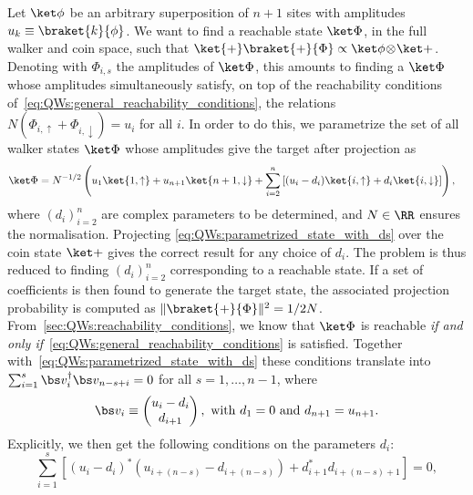 Let $\ket\phi$ be an arbitrary superposition of $n+1$ sites with amplitudes $u_k \equiv \braket{k}{\phi}$.
We want to find a reachable state $\ket\Phi$, in the full walker and coin space, such that
$\ket{+}\braket{+}{\Phi} \propto \ket\phi \!\otimes\! \ket+$.
Denoting with $\Phi_{i,s}$ the amplitudes of $\ket\Phi$, this amounts to finding a $\ket\Phi$ whose amplitudes simultaneously satisfy, on top of the reachability conditions of~\cref{eq:QWs:general_reachability_conditions}, the relations
${N(\Phi_{i,\uparrow}+\Phi_{i,\downarrow})= u_i}$ for all $i$.
In order to do this, we parametrize the set of all walker states $\ket\Phi$ whose amplitudes give the target after projection as
\begin{equation}
\begin{aligned}
    \ket\Phi &= N^{-1/2} \left( u_1 \ket{1,\uparrow} + u_{n+1} \ket{n+1,\downarrow}
	+ \sum_{i=2}^n \left[
		(u_i - d_i) \ket{i, \uparrow} +
		d_i \ket{i, \downarrow}
	\right] \right),
\end{aligned}
\label{eq:QWs:parametrized_state_with_ds}
\end{equation}
where $(d_i)_{i=2}^n$ are complex parameters to be determined, and $N\in\RR$ ensures the normalisation.
Projecting \cref{eq:QWs:parametrized_state_with_ds} over the coin state $\ket+$ gives the correct result for any choice of $d_i$.
The problem is thus reduced to finding $(d_i)_{i=2}^n$ corresponding to a reachable state.
If a set of coefficients is then found to generate the target state, the associated projection probability is computed as
$\|\braket{+}{\Phi}\|^2=1/2N$.
From~\cref{sec:QWs:reachability_conditions}, we know that $\ket\Phi$ is reachable \textit{if and only if}~\cref{eq:QWs:general_reachability_conditions} is satisfied. Together with~\cref{eq:QWs:parametrized_state_with_ds} these conditions translate into $\sum_{i=1}^{s} \bs v_i^\dagger \bs v_{n-s+i}=0$ for all $s=1,\dots,n-1$, where
\begin{equation}
    \bs v_i \equiv \begin{pmatrix}
        u_i - d_i \\ d_{i+1}
    \end{pmatrix},
    \text{ with } d_1 = 0 \text{ and } d_{n+1}=u_{n+1}.
\end{equation}
Explicitly, we then get the following conditions on the parameters $d_i$:
\begin{equation}
	\sum_{i=1}^s \left[
	  (u_i - d_i)^*
      (u_{i+(n-s)} - d_{i+(n-s)})
	  +
      d_{i+1}^* d_{i+(n-s)+1}
    \right]
	= 0,
	\label{eq:QWs:conditions_for_ds}
\end{equation}
